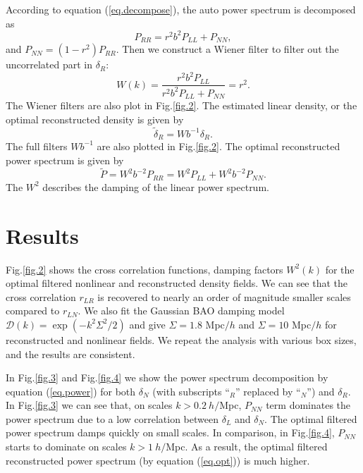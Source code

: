 \documentclass[aps,prd,twocolumn,superscriptaddress,amsfont,amssymb,amsmath,nofootinbib,showpacs,balancelastpage]{revtex4-1}
\begin{document}
According to equation (\ref{eq.decompose}), the auto power spectrum is decomposed as
\begin{equation}\label{eq.power}
    P_{RR}=r^2b^2P_{LL}+P_{NN},
\end{equation}
and $P_{NN}=(1-r^2)P_{RR}$. Then we construct a Wiener filter to filter out the uncorrelated part in $\delta_R$:
\begin{equation}
    W(k)=\frac{r^2b^2P_{LL}}{r^2b^2P_{LL}+P_{NN}}=r^2.
\end{equation}
The Wiener filters are also plot in Fig.\ref{fig.2}. The estimated linear density, or the optimal reconstructed density is given by
\begin{equation}
    \tilde\delta_R=Wb^{-1}\delta_R.
\end{equation}
The full filters $Wb^{-1}$ are also plotted in Fig.\ref{fig.2}.
The optimal reconstructed power spectrum is given by
\begin{equation}\label{eq.opt}
    \tilde P=W^2b^{-2}P_{RR}=W^2P_{LL}+W^2b^{-2}P_{NN}.
\end{equation}
The $W^2$ describes the damping of the linear power spectrum.

\section{Results}\label{sec.results}
Fig.\ref{fig.2} shows the cross correlation functions,
damping factors $W^2(k)$ for the optimal filtered 
nonlinear and reconstructed density fields.
We can see that the cross correlation $r_{LR}$ is recovered to
nearly an order of magnitude smaller scales compared to $r_{LN}$.
We also fit the Gaussian BAO damping model $
{\mathcal D}(k)=\exp(-k^2\Sigma^2/2)$ and give $\Sigma=1.8$ Mpc$/h$ and $\Sigma=10$ 
Mpc$/h$ for reconstructed and nonlinear fields.
We repeat the analysis with various box sizes,
and the results are consistent.

In Fig.\ref{fig.3} and Fig.\ref{fig.4} we show the power spectrum
decomposition by equation (\ref{eq.power}) for both $\delta_N$ 
(with subscripts ``$_R$'' replaced by ``$_N$'') and $\delta_R$.
In Fig.\ref{fig.3} we can see that, on scales $k>0.2\ h/$Mpc,
$P_{NN}$ term dominates the power spectrum due to a low correlation
between $\delta_L$ and $\delta_N$. The optimal filtered power spectrum
damps quickly on small scales. In comparison, in Fig.\ref{fig.4},
$P_{NN}$ starts to dominate on scales $k>1\ h/$Mpc. As a result, the
optimal filtered reconstructed power spectrum
(by equation (\ref{eq.opt})) is much higher.
\end{document}
